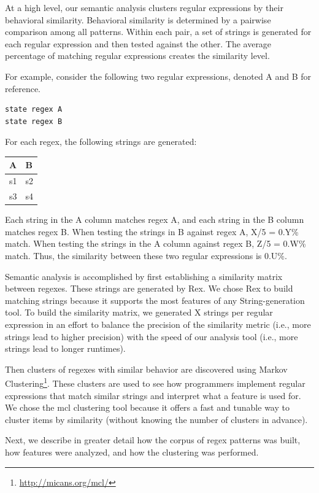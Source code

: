 At a high level, our semantic analysis clusters regular expressions by their behavioral similarity. Behavioral similarity is determined by a pairwise comparison among all patterns. Within each pair, a set of strings is generated for each regular expression and then tested against the other. The average percentage of matching regular expressions creates the similarity level. 

For example, consider the following two regular expressions, denoted A and B for reference. 

\begin{verbatim}
state regex A
state regex B
\end{verbatim}

For each regex, the following strings are generated:

\begin{tabular}{l | l} 
A & B \\ \hline
s1 & s2 \\
s3 & s4 \\ 
\end{tabular}

Each string in the A column matches regex A, and each string in the B column matches regex B. When testing the strings in B against regex A, X/5 = 0.Y\% match. When testing the strings in the A column against regex B, Z/5 = 0.W\% match. Thus, the similarity between these two regular expressions is 0.U\%. 

Semantic analysis is accomplished by first establishing a similarity matrix between regexes. These strings are generated by Rex.  We chose Rex to build matching strings because it supports the most features of any String-generation tool. To build the similarity matrix, we generated X strings per regular expression in an effort to balance the precision of the similarity metric (i.e., more strings lead to higher precision) with the speed of our analysis tool (i.e., more strings lead to longer runtimes).  

Then clusters of regexes with similar behavior are discovered using Markov Clustering\footnote{\url{http://micans.org/mcl/}}.  These clusters are used to see how programmers implement regular expressions that match similar strings and interpret what a feature is used for. 
 We chose the mcl clustering tool because it offers a fast and tunable way to cluster items by similarity (without knowing the number of clusters in advance).


Next, we describe in greater detail how the corpus of regex patterns was built, how features were analyzed, and how the clustering was performed. 




